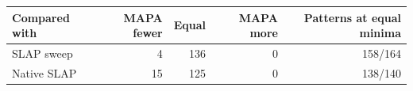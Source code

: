 \begin{tabular}{@{}lrrrr@{}}\toprule
Compared with & MAPA fewer & Equal & MAPA more & Patterns at equal minima\\\midrule
SLAP sweep & 4 & 136 & 0 & 158/164\\
Native SLAP & 15 & 125 & 0 & 138/140\\
\bottomrule\end{tabular}
